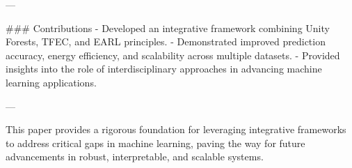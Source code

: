 ---

### Contributions
- Developed an integrative framework combining Unity Forests, TFEC, and EARL principles.
- Demonstrated improved prediction accuracy, energy efficiency, and scalability across multiple datasets.
- Provided insights into the role of interdisciplinary approaches in advancing machine learning applications.

--- 

This paper provides a rigorous foundation for leveraging integrative frameworks to address critical gaps in machine learning, paving the way for future advancements in robust, interpretable, and scalable systems.